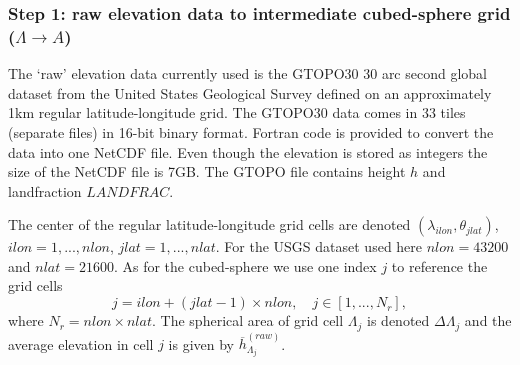 \documentclass[gmd]{copernicus}
\begin{document}
\subsubsection{Step 1: raw elevation data to intermediate cubed-sphere grid ($\Lambda \rightarrow A$)}\label{sec:step1}
The `raw' elevation data currently used is the GTOPO30 30 arc second global dataset from the United States Geological Survey \citep[USGS][]{USGS} defined on an approximately 1km regular latitude-longitude grid. The GTOPO30 data comes in 33 tiles (separate files) in 16-bit binary format. Fortran code is provided to convert the data into one NetCDF file. Even though the elevation is stored as integers the size of the NetCDF file is 7GB. The GTOPO file contains height $h$ and landfraction $LANDFRAC$.

The center of the regular latitude-longitude grid cells are denoted $(\lambda_{ilon},\theta_{jlat})$, $ilon=1,..., nlon$, $jlat=1, ..., nlat$. For the USGS dataset used here $nlon=43200$ and $nlat=21600$. As for the cubed-sphere we use one index $j$ to reference the grid cells
\begin{equation}
j=ilon+(jlat-1)\times nlon, \quad j\in [1, ..., N_r],
\end{equation} 
where $N_r=nlon\times nlat$. The spherical area of grid cell $\Lambda_j$ is denoted $\Delta \Lambda_j$ and the average elevation in cell $j$ is given by $\overline{h}^{(raw)}_{\Lambda_j}$. 
\end{document}
